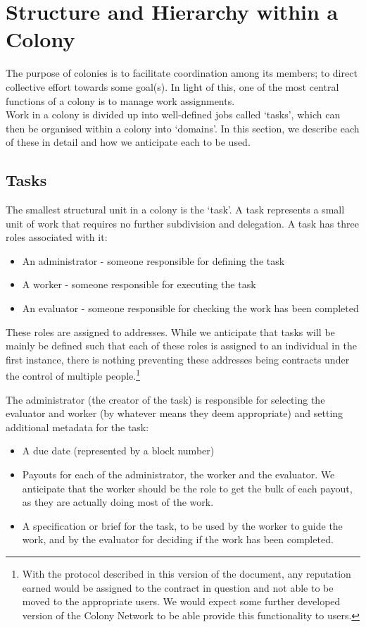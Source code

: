 \section{Structure and Hierarchy within a Colony}
The purpose of colonies is to facilitate coordination among its members; to direct collective effort towards some goal(s). In light of this, one of the most central functions of a colony is to manage work assignments.\\
Work in a colony is divided up into well-defined jobs called `tasks', which can then be organised within a colony into `domains'. In this section, we describe each of these in detail and how we anticipate each to be used.

\subsection{Tasks}\label{sec:tasks}

The smallest structural unit in a colony is the `task'. A task represents a small unit of work that requires no further subdivision and delegation. A task has three roles associated with it:
\begin{itemize}
\item An administrator - someone responsible for defining the task
\item A worker - someone responsible for executing the task
\item An evaluator - someone responsible for checking the work has been completed
\end{itemize}

These roles are assigned to addresses. While we anticipate that tasks will be mainly be defined such that each of these roles is assigned to an individual in the first instance, there is nothing preventing these addresses being contracts under the control of multiple people.\footnote{With the protocol described in this version of the document, any reputation  earned would be assigned to the contract in question and not able to be moved to the appropriate users. We would expect some further developed version of the Colony Network to be able provide this functionality to users.}

The administrator (the creator of the task) is responsible for selecting the evaluator and worker (by whatever means they deem appropriate) and setting additional metadata for the task:

\begin{itemize}
\item A due date (represented by a block number)
\item Payouts for each of the administrator, the worker and the evaluator. We anticipate that the worker should be the role to get the bulk of each payout, as they are actually doing most of the work. 
\item A specification or brief for the task, to be used by the worker to guide the work, and by the evaluator for deciding if the work has been completed.
\end{itemize}


